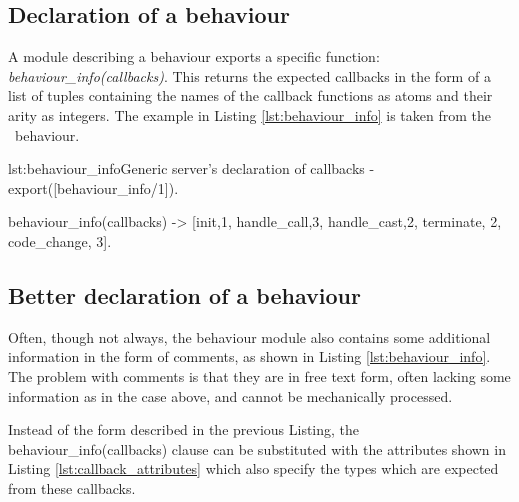 \subsection{Declaration of a behaviour}

A module describing a behaviour exports a specific function:
\emph{behaviour\_info(callbacks)}. This returns the expected callbacks
in the form of a list of tuples containing the names of the callback
functions as atoms and their arity as integers. The example in Listing
\ref{lst:behaviour_info} is taken from the \genserv\ behaviour.

\begin{console}{lst:behaviour_info}{Generic server's declaration of callbacks}
-export([behaviour_info/1]).

behaviour_info(callbacks) ->
  [{init,1}, {handle_call,3}, {handle_cast,2},
   {terminate, 2}, {code_change, 3}].


\end{console}

\subsection{Better declaration of a behaviour}

Often, though not always, the behaviour module also contains some
additional information in the form of comments, as shown in Listing
\ref{lst:behaviour_info}. The problem with comments is that they are
in free text form, often lacking some information as in the case
above, and cannot be mechanically processed.

Instead of the form described in the previous Listing, the
behaviour\_info(callbacks) clause can be substituted with the
attributes shown in Listing \ref{lst:callback_attributes} which also
specify the types which are expected from these callbacks.

